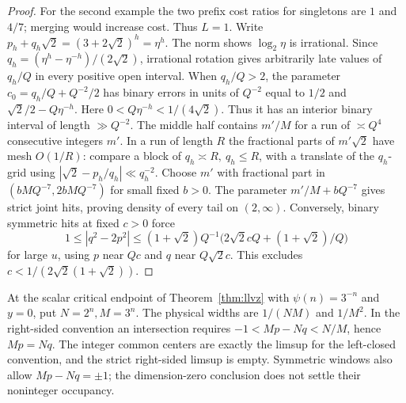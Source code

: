 \documentclass[11pt,reqno,a4paper]{amsart}
\theoremstyle{remark}
\numberwithin{equation}{section}
\begin{document}
\begin{proof}
For the second example the two prefix cost ratios for singletons are \(1\) and \(4/7\); merging would increase cost. Thus \(L=1\). Write \(p_h+q_h\sqrt2=(3+2\sqrt2)^h=\eta^h\). The norm shows \(\log_2\eta\) is irrational. Since \(q_h=(\eta^h-\eta^{-h})/(2\sqrt2)\), irrational rotation gives arbitrarily late values of \(q_h/Q\) in every positive open interval. When \(q_h/Q>2\), the parameter \(c_0=q_h/Q+Q^{-2}/2\) has binary errors in units of \(Q^{-2}\) equal to \(1/2\) and \(\sqrt2/2-Q\eta^{-h}\). Here \(0<Q\eta^{-h}<1/(4\sqrt2)\). Thus it has an interior binary interval of length \(\gg Q^{-2}\). The middle half contains \(m'/M\) for a run of \(\asymp Q^4\) consecutive integers \(m'\). In a run of length \(R\) the fractional parts of \(m'\sqrt2\) have mesh \(O(1/R)\): compare a block of \(q_h\asymp R,\ q_h\le R\), with a translate of the \(q_h\)-grid using \(|\sqrt2-p_h/q_h|\ll q_h^{-2}\).
Choose \(m'\) with fractional part in \((bMQ^{-7},2bMQ^{-7})\) for small fixed \(b>0\). The parameter \(m'/M+bQ^{-7}\) gives strict joint hits, proving density of every tail on \((2,\infty)\).
Conversely, binary symmetric hits at fixed \(c>0\) force
\[
 1\le |q^2-2p^2|
 \le (1+\sqrt2)Q^{-1}\big(2\sqrt2 cQ+(1+\sqrt2)/Q\big)
\]
for large \(u\), using \(p\) near \(Qc\) and \(q\) near \(Q\sqrt2 c\). This excludes \(c<1/(2\sqrt2(1+\sqrt2))\).
\end{proof}

At the scalar critical endpoint of Theorem~\ref{thm:llvz} with \(\psi(n)=3^{-n}\) and \(y=0\), put \(N=2^n,M=3^n\). The physical widths are \(1/(NM)\) and \(1/M^2\). In the right-sided convention an intersection requires \(-1<Mp-Nq<N/M\), hence \(Mp=Nq\). The integer common centers are exactly the limsup for the left-closed convention, and the strict right-sided limsup is empty. Symmetric windows also allow \(Mp-Nq=\pm1\); the dimension-zero conclusion does not settle their noninteger occupancy.
\end{document}

